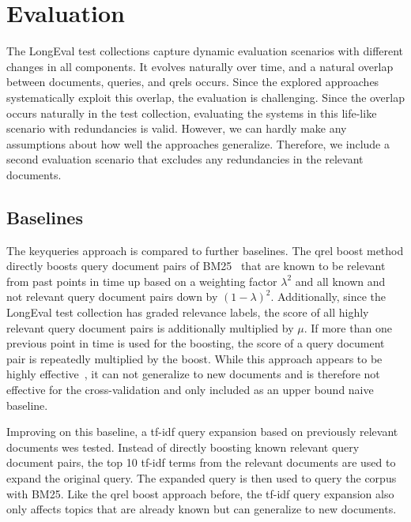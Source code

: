 \section{Evaluation}






The LongEval test collections capture dynamic evaluation scenarios with different changes in all components. It evolves naturally over time, and a natural overlap between documents, queries, and qrels occurs. Since the explored approaches systematically exploit this overlap, the evaluation is challenging. Since the overlap occurs naturally in the test collection, evaluating the systems in this life-like scenario with redundancies is valid. However, we can hardly make any assumptions about how well the approaches generalize. Therefore, we include a second evaluation scenario that excludes any redundancies in the relevant documents.

  
\subsection{Baselines}
The keyqueries approach is compared to further baselines. The qrel boost method directly boosts query document pairs of BM25~\cite{robertson:1994} that are known to be relevant from past points in time up based on a weighting factor $\lambda^2$ and all known and not relevant query document pairs down by $(1-\lambda)^2$. Additionally, since the LongEval test collection has graded relevance labels, the score of all highly relevant query document pairs is additionally multiplied by $\mu$. If more than one previous point in time is used for the boosting, the score of a query document pair is repeatedly multiplied by the boost. While this approach appears to be highly effective~\cite{alkhalifa:2024,keller:2024b}, it can not generalize to new documents and is therefore not effective for the cross-validation and only included as an upper bound naive baseline.

Improving on this baseline, a tf-idf query expansion based on previously relevant documents wes tested. Instead of directly boosting known relevant query document pairs, the top 10 tf-idf terms from the relevant documents are used to expand the original query. The expanded query is then used to query the corpus with BM25. Like the qrel boost approach before, the tf-idf query expansion also only affects topics that are already known but can generalize to new documents.


